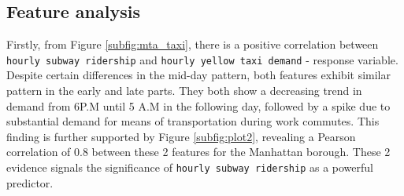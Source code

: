 \documentclass[11pt]{article}
\begin{document}
\subsection{Feature analysis}
Firstly, from Figure \ref{subfig:mta_taxi}, there is a positive correlation between \texttt{hourly subway ridership} and \texttt{hourly yellow taxi demand} - response variable. Despite certain differences in the mid-day pattern, both features exhibit similar pattern in the early and late parts. They both show a decreasing trend in demand from 6P.M until 5 A.M in the following day, followed by a spike due to substantial demand for means of transportation during work commutes. This finding is further supported by Figure \ref{subfig:plot2}, revealing a Pearson correlation of 0.8 between these 2 features for the Manhattan borough. These 2 evidence signals the significance of \texttt{hourly subway ridership} as a powerful predictor.
\end{document}
